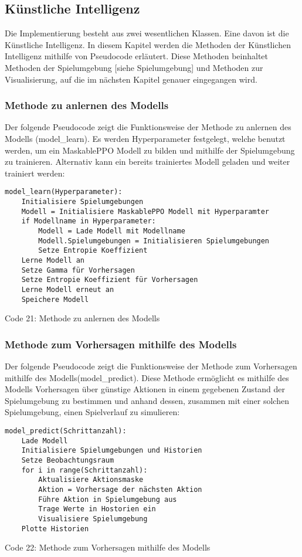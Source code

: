 \subsection{Künstliche Intelligenz}
Die Implementierung besteht aus zwei wesentlichen Klassen. Eine davon ist die Künstliche Intelligenz. In diesem Kapitel werden die Methoden der Künstlichen Intelligenz mithilfe von Pseudocode erläutert. Diese Methoden beinhaltet Methoden der Spielumgebung [siehe Spielumgebung] und Methoden zur Visualisierung, auf die im nächsten Kapitel genauer eingegangen wird.
\subsubsection{Methode zu anlernen des Modells}
\begin{minipage}{\linewidth}
Der folgende Pseudocode zeigt die Funktionsweise der Methode zu anlernen des Modells (model\_learn). Es werden Hyperparameter festgelegt, welche benutzt werden, um ein MaskablePPO Modell zu bilden und mithilfe der Spielumgebung zu trainieren. Alternativ kann ein bereits trainiertes Modell geladen und weiter trainiert werden:
\vspace{0.5cm}
\begin{lstlisting}
model_learn(Hyperparameter):
	Initialisiere Spielumgebungen
	Modell = Initialisiere MaskablePPO Modell mit Hyperparamter
	if Modellname in Hyperparameter:
		Modell = Lade Modell mit Modellname
		Modell.Spielumgebungen = Initialisieren Spielumgebungen
		Setze Entropie Koeffizient
	Lerne Modell an
	Setze Gamma für Vorhersagen
	Setze Entropie Koeffizient für Vorhersagen
	Lerne Modell erneut an
	Speichere Modell
\end{lstlisting}
Code 21: Methode zu anlernen des Modells\\
\end{minipage}
\subsubsection{Methode zum Vorhersagen mithilfe des Modells}
\begin{minipage}{\linewidth}
Der folgende Pseudocode zeigt die Funktionsweise der Methode zum Vorhersagen mithilfe des Modells(model\_predict). Diese Methode ermöglicht es mithilfe des Modells Vorhersagen über günstige Aktionen in einem gegebenen Zustand der Spielumgebung zu bestimmen und anhand dessen, zusammen mit einer solchen Spielumgebung, einen Spielverlauf zu simulieren:
\vspace{0.5cm}
\begin{lstlisting}
model_predict(Schrittanzahl):
	Lade Modell
	Initialisiere Spielumgebungen und Historien
	Setze Beobachtungsraum
	for i in range(Schrittanzahl):
		Aktualisiere Aktionsmaske
		Aktion = Vorhersage der nächsten Aktion
		Führe Aktion in Spielumgebung aus
		Trage Werte in Hostorien ein
		Visualisiere Spielumgebung
	Plotte Historien
\end{lstlisting}
Code 22: Methode zum Vorhersagen mithilfe des Modells\\
\end{minipage}
